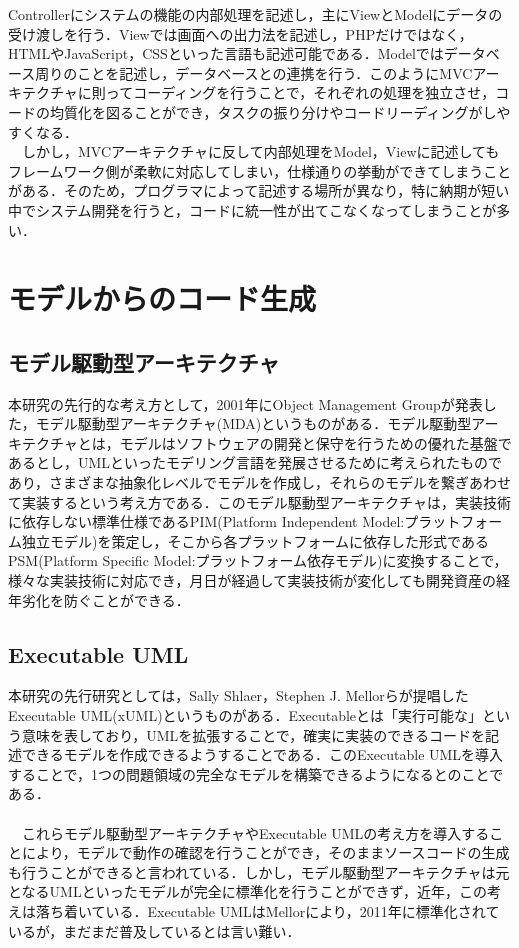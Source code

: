\documentclass{funthesis}
\begin{document}
Controllerにシステムの機能の内部処理を記述し，主にViewとModelにデータの受け渡しを行う．Viewでは画面への出力法を記述し，PHPだけではなく，HTMLやJavaScript，CSSといった言語も記述可能である．Modelではデータベース周りのことを記述し，データベースとの連携を行う．このようにMVCアーキテクチャに則ってコーディングを行うことで，それぞれの処理を独立させ，コードの均質化を図ることができ，タスクの振り分けやコードリーディングがしやすくなる．\\
　しかし，MVCアーキテクチャに反して内部処理をModel，Viewに記述してもフレームワーク側が柔軟に対応してしまい，仕様通りの挙動ができてしまうことがある．そのため，プログラマによって記述する場所が異なり，特に納期が短い中でシステム開発を行うと，コードに統一性が出てこなくなってしまうことが多い．\\
\section{モデルからのコード生成}

\subsection{モデル駆動型アーキテクチャ}
本研究の先行的な考え方として，2001年にObject Management Groupが発表した，モデル駆動型アーキテクチャ(MDA)\cite{mda}というものがある．モデル駆動型アーキテクチャとは，モデルはソフトウェアの開発と保守を行うための優れた基盤であるとし，UMLといったモデリング言語を発展させるために考えられたものであり，さまざまな抽象化レベルでモデルを作成し，それらのモデルを繋ぎあわせて実装するという考え方である．このモデル駆動型アーキテクチャは，実装技術に依存しない標準仕様であるPIM(Platform Independent Model:プラットフォーム独立モデル)を策定し，そこから各プラットフォームに依存した形式であるPSM(Platform Specific Model:プラットフォーム依存モデル)に変換することで，様々な実装技術に対応でき，月日が経過して実装技術が変化しても開発資産の経年劣化を防ぐことができる\cite{mda2}．

\subsection{Executable UML}
本研究の先行研究としては，Sally Shlaer，Stephen J. Mellorらが提唱したExecutable UML(xUML)\cite{exec}というものがある．Executableとは「実行可能な」という意味を表しており，UMLを拡張することで，確実に実装のできるコードを記述できるモデルを作成できるようすることである．このExecutable UMLを導入することで，1つの問題領域の完全なモデルを構築できるようになるとのことである．\\
\\
　これらモデル駆動型アーキテクチャやExecutable UMLの考え方を導入することにより，モデルで動作の確認を行うことができ，そのままソースコードの生成も行うことができると言われている．しかし，モデル駆動型アーキテクチャは元となるUMLといったモデルが完全に標準化を行うことができず，近年，この考えは落ち着いている．Executable UMLはMellorにより，2011年に標準化されているが，まだまだ普及しているとは言い難い．
\end{document}

